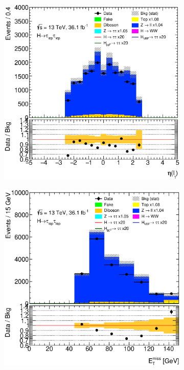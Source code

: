 \begin{figure}[htb]
\begin{subfigure}[t]{0.3\textwidth}
    \end{subfigure}
    \begin{subfigure}[t]{0.3\textwidth}
        \includegraphics[width=\textwidth]{./plots/mva/modeling/input_vars/BOOST_CR/ll-CutMVABoostedCatZllCR-LeptonEta0-lin.eps}
    \end{subfigure}
    \begin{subfigure}[t]{0.3\textwidth}
        \includegraphics[width=\textwidth]{./plots/mva/modeling/input_vars/BOOST_CR/ll-CutMVABoostedCatZllCR-MET-lin.eps}

\end{subfigure}
\end{figure}
